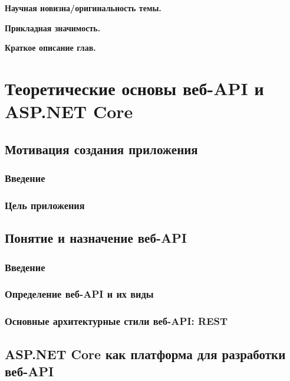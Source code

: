 \documentclass[a4paper,12pt]{report}
\begin{document}
\textbf{Научная новизна/оригинальность темы.}


\textbf{Прикладная значимость.}

\textbf{Краткое описание глав.}

\chapter{Теоретические основы веб-\ac{API} и ASP.NET Core}\label{intro_chapter_title}

\section{Мотивация создания приложения}

\subsection{Введение}

\subsection{Цель приложения}

\subsection{}


\section{Понятие и назначение веб-\ac{API}}

\subsection{Введение}

\subsection{Определение веб-\ac{API} и их виды}

\subsection{Основные архитектурные стили веб-\ac{API}: \ac{REST}}


\section{ASP.NET Core как платформа для разработки веб-\ac{API}}
\end{document}
